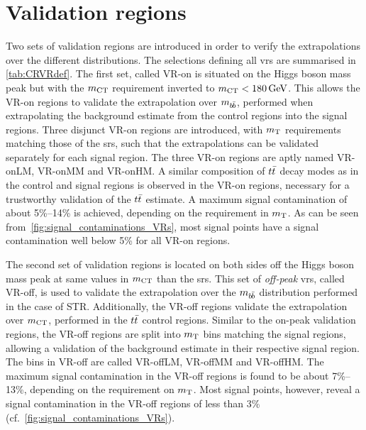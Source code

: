 \section{Validation regions}

Two sets of validation regions are introduced in order to verify the extrapolations over the different distributions. The selections defining all \glspl{vr} are summarised in \cref{tab:CRVRdef}. The first set, called VR-on is situated on the Higgs boson mass peak but with the $m_{\textrm{CT}}$ requirement inverted to $\mct<\SI{180}{\GeV}$. This allows the VR-on regions to validate the extrapolation over $m_{b\hspace{-0.06em}\bar{b}}$, performed when extrapolating the background estimate from the control regions into the signal regions. Three disjunct VR-on regions are introduced, with $m_{\textrm{T}}$ requirements matching those of the \glspl{sr}, such that the extrapolations can be validated separately for each signal region. The three VR-on regions are aptly named VR-onLM, VR-onMM and VR-onHM. A similar composition of $t\bar{t}$ decay modes as in the control and signal regions is observed in the VR-on regions, necessary for a trustworthy validation of the $t\bar{t}$ estimate. A maximum signal contamination of about 5\%--14\% is achieved, depending on the requirement in $m_{\textrm{T}}$. As can be seen from~\cref{fig:signal_contaminations_VRs}, most signal points have a signal contamination well below 5\% for all VR-on regions.  

 The second set of validation regions is located on both sides off the Higgs boson mass peak at same values in $m_{\textrm{CT}}$ than the \glspl{sr}. This set of \textit{off-peak} \glspl{vr}, called VR-off, is used to validate the extrapolation over the $m_{b\hspace{-0.06em}\bar{b}}$ distribution performed in the case of STR. Additionally, the VR-off regions validate the extrapolation over $m_{\textrm{CT}}$, performed in the $t\bar{t}$ control regions. Similar to the on-peak validation regions, the VR-off regions are split into $m_{\textrm{T}}$ bins matching the signal regions, allowing a validation of the background estimate in their respective signal region. The bins in VR-off are called VR-offLM, VR-offMM and VR-offHM. The maximum signal contamination in the VR-off regions is found to be about 7\%--13\%, depending on the requirement on $m_{\textrm{T}}$. Most signal points, however, reveal a signal contamination in the VR-off regions of less than 3\% (cf.~\cref{fig:signal_contaminations_VRs}).



